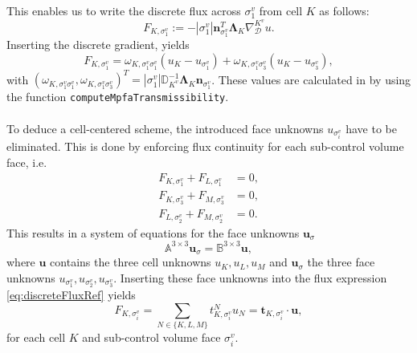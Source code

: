 This enables us to write the discrete flux across $\sigma^v_1$ from cell $K$ as follows:
\begin{equation}
    F_{K, \sigma^v_1} := - |\sigma^v_1| \mathbf{n}_{\sigma^v_1}^T \mathbf{\Lambda}_K \nabla_\mathcal{D}^{K^v} u.
    \label{eq:discreteFlux}
\end{equation}
Inserting the discrete gradient, yields
\begin{equation}
    F_{K, \sigma^v_1} = \omega_{K,\sigma^v_1\sigma^v_1}(u_K - u_{\sigma^v_1}) + \omega_{K,\sigma^v_1 \sigma^v_3}(u_K - u_{\sigma^v_3}),
    \label{eq:discreteFluxRef}
\end{equation}
with $(\omega_{K,\sigma^v_1\sigma^v_1},\omega_{K,\sigma^v_1 \sigma^v_3})^T = |\sigma^v_1| \mathbb{D}^{-1}_{K^v}\mathbf{\Lambda}_K \mathbf{n}_{\sigma^v_1}$. These values are calculated in \Dumux by using the function \texttt{computeMpfaTransmissibility}.
\\ \ \\
To deduce a cell-centered scheme, the introduced face unknowns $u_{\sigma^v_i}$ have to be eliminated. This is done by enforcing flux continuity for each sub-control volume face, i.e.
\begin{align}
F_{K, \sigma^v_1} + F_{L, \sigma^v_1} &= 0, \\ F_{K, \sigma^v_3} + F_{M, \sigma^v_3} &= 0, \\ F_{L, \sigma^v_2} + F_{M, \sigma^v_2} &= 0.
\end{align}
This results in a system of equations for the face unknowns $\mathbf{u}_{\sigma}$
\begin{equation}
\mathbb{A}^{3\times 3} \mathbf{u}_{\sigma} = \mathbb{B}^{3\times 3} \mathbf{u},
\end{equation}
where $\mathbf{u}$ contains the three cell unknowns $u_K,u_L,u_M$ and $\mathbf{u}_{\sigma}$ the three face unknowns $u_{\sigma^v_1}, u_{\sigma^v_2}, u_{\sigma^v_3}$. 
Inserting these face unknowns into the flux expression \eqref{eq:discreteFluxRef} yields
\begin{equation}
    F_{K,\sigma^v_i} = \sum_{N \in \lbrace K,L,M \rbrace } t^N_{K,\sigma^v_i} u_{N} = \mathbf{t}_{K,\sigma^v_i} \cdot \mathbf{u},
    \label{eq:FVFluxExpressionSubFace}
\end{equation}
for each cell $K$ and sub-control volume face $\sigma^v_i$. 


